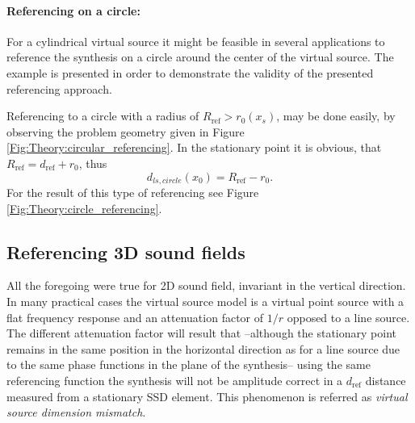\documentclass[12pt,a4paper]{article}
\newcommand{\dref}{d_{\mathrm{ref}}}
\begin{document}
\paragraph{Referencing on a circle:\\}
For a cylindrical virtual source it might be feasible in several applications to reference the synthesis on a circle around the center of the virtual source. The example is presented in order to demonstrate the validity of the presented referencing approach.

Referencing to a circle with a radius of $R_{\mathrm{ref}} > r_0(x_s)$, may be done easily, by observing the problem geometry given in Figure \ref{Fig:Theory:circular_referencing}. 
In the stationary point it is obvious, that $R_{\mathrm{ref}} = \dref + r_0$, thus
\begin{equation}
d_{ls,circle}(x_0) = R_{\mathrm{ref}} - r_0.
\end{equation}
For the result of this type of referencing see Figure \ref{Fig:Theory:circle_referencing}.


\subsection{Referencing 3D sound fields}

All the foregoing were true for 2D sound field, invariant in the vertical direction. In many practical cases the virtual source model is a virtual point source with a flat frequency response and an attenuation factor of $1/r$ opposed to a line source. The different attenuation factor will result that --although the stationary point remains in the same position in the horizontal direction as for a line source due to the same phase functions in the plane of the synthesis-- using the same referencing function the synthesis will not be amplitude correct in a $\dref$ distance measured from a stationary SSD element. This phenomenon is referred as \emph{virtual source dimension mismatch}.
\end{document}
